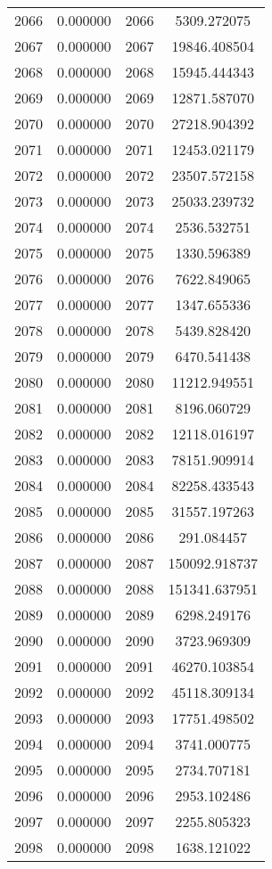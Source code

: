 \documentclass[12pt]{article}
\begin{document}
\begin{longtable}{@{}cccc@{}}
2066 & 0.000000 & 2066 & 5309.272075 \\
2067 & 0.000000 & 2067 & 19846.408504 \\
2068 & 0.000000 & 2068 & 15945.444343 \\
2069 & 0.000000 & 2069 & 12871.587070 \\
2070 & 0.000000 & 2070 & 27218.904392 \\
2071 & 0.000000 & 2071 & 12453.021179 \\
2072 & 0.000000 & 2072 & 23507.572158 \\
2073 & 0.000000 & 2073 & 25033.239732 \\
2074 & 0.000000 & 2074 & 2536.532751 \\
2075 & 0.000000 & 2075 & 1330.596389 \\
2076 & 0.000000 & 2076 & 7622.849065 \\
2077 & 0.000000 & 2077 & 1347.655336 \\
2078 & 0.000000 & 2078 & 5439.828420 \\
2079 & 0.000000 & 2079 & 6470.541438 \\
2080 & 0.000000 & 2080 & 11212.949551 \\
2081 & 0.000000 & 2081 & 8196.060729 \\
2082 & 0.000000 & 2082 & 12118.016197 \\
2083 & 0.000000 & 2083 & 78151.909914 \\
2084 & 0.000000 & 2084 & 82258.433543 \\
2085 & 0.000000 & 2085 & 31557.197263 \\
2086 & 0.000000 & 2086 & 291.084457 \\
2087 & 0.000000 & 2087 & 150092.918737 \\
2088 & 0.000000 & 2088 & 151341.637951 \\
2089 & 0.000000 & 2089 & 6298.249176 \\
2090 & 0.000000 & 2090 & 3723.969309 \\
2091 & 0.000000 & 2091 & 46270.103854 \\
2092 & 0.000000 & 2092 & 45118.309134 \\
2093 & 0.000000 & 2093 & 17751.498502 \\
2094 & 0.000000 & 2094 & 3741.000775 \\
2095 & 0.000000 & 2095 & 2734.707181 \\
2096 & 0.000000 & 2096 & 2953.102486 \\
2097 & 0.000000 & 2097 & 2255.805323 \\
2098 & 0.000000 & 2098 & 1638.121022 \\

\end{longtable}
\end{document}
